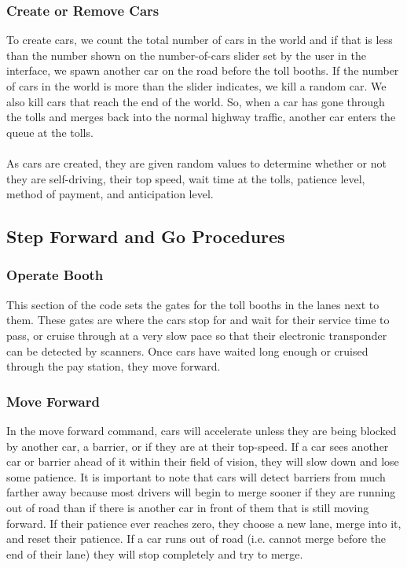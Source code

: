 \documentclass{article}
\begin{document}
\subsubsection{Create or Remove Cars}
To create cars, we count the total number of cars in the world and if that is less than the number shown on the number-of-cars slider set by the user in the interface, we spawn another car on the road before the toll booths. If the number of cars in the world is more than the slider indicates, we kill a random car. We also kill cars that reach the end of the world. So, when a car has gone through the tolls and merges back into the normal highway traffic, another car enters the queue at the tolls.\\ \\
As cars are created, they are given random values to determine whether or not they are self-driving, their top speed, wait time at the tolls, patience level, method of payment, and anticipation level.

\subsection{Step Forward and Go Procedures}
\subsubsection{Operate Booth}
This section of the code sets the gates for the toll booths in the lanes next to them. These gates are where the cars stop for and wait for their service time to pass, or cruise through at a very slow pace so that their electronic transponder can be detected by scanners. Once cars have waited long enough or cruised through the pay station, they move forward.

\subsubsection{Move Forward}
In the move forward command, cars will accelerate unless they are being blocked by another car, a barrier, or if they are at their top-speed. If a car sees another car or barrier ahead of it within their field of vision, they will slow down and lose some patience. It is important to note that cars will detect barriers from much farther away because most drivers will begin to merge sooner if they are running out of road than if there is another car in front of them that is still moving forward. If their patience ever reaches zero, they choose a new lane, merge into it, and reset their patience. If a car runs out of road (i.e. cannot merge before the end of their lane) they will stop completely and try to merge.
\end{document}
